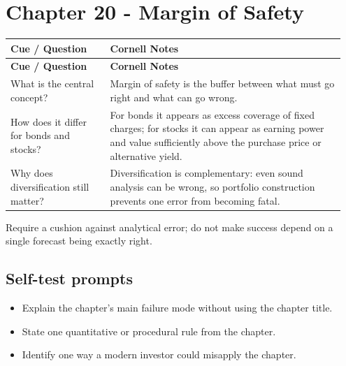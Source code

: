 \documentclass[11pt]{article}
\begin{document}
\section{Chapter 20 - Margin of Safety}
\begin{longtable}{@{}>{\raggedright\arraybackslash}p{0.29\linewidth}>{\raggedright\arraybackslash}p{0.66\linewidth}@{}}\toprule\textbf{Cue / Question} & \textbf{Cornell Notes}\\\midrule\endfirsthead\toprule\textbf{Cue / Question} & \textbf{Cornell Notes}\\\midrule\endhead
What is the central concept? & Margin of safety is the buffer between what must go right and what can go wrong. \\
How does it differ for bonds and stocks? & For bonds it appears as excess coverage of fixed charges; for stocks it can appear as earning power and value sufficiently above the purchase price or alternative yield. \\
Why does diversification still matter? & Diversification is complementary: even sound analysis can be wrong, so portfolio construction prevents one error from becoming fatal. \\
\bottomrule\end{longtable}
\begin{principlebox}Require a cushion against analytical error; do not make success depend on a single forecast being exactly right.\end{principlebox}
\subsection*{Self-test prompts}\begin{itemize}\item Explain the chapter's main failure mode without using the chapter title.\item State one quantitative or procedural rule from the chapter.\item Identify one way a modern investor could misapply the chapter.\end{itemize}
\end{document}
